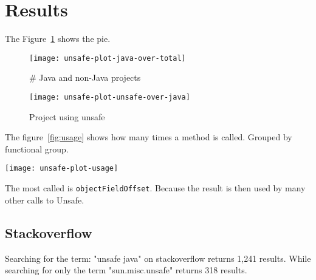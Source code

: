 
\section{Results} \label{sec:results}

The Figure~\ref{fig:java-over-total} shows the pie.

\begin{figure}[htb]
\centering
\texttt{[image: unsafe-plot-java-over-total]}
\caption{\# Java and non-Java projects} \label{fig:java-over-total}
\end{figure}

\begin{figure}[htb]
\centering
\texttt{[image: unsafe-plot-unsafe-over-java]}
\caption{Project using unsafe} \label{fig:unsafe-over-java}
\end{figure}

The figure~\ref{fig:usage} shows how many times a method is called. Grouped by functional group.

\begin{figure*}[htb]
\texttt{[image: unsafe-plot-usage]}
\caption{sun.misc.Unsafe methods usage} \label{fig:usage}
\end{figure*}

The most called is \texttt{objectFieldOffset}. Because the result is then used by many other calls to Unsafe.






\subsection{Stackoverflow}

Searching for the term: "unsafe java" on stackoverflow returns 1,241 results.
While searching for only the term "sun.misc.unsafe" returns 318 results.
